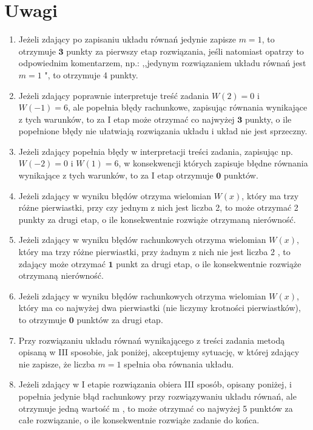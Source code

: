 \documentclass[10pt]{article}
\begin{document}
\section*{Uwagi}
\begin{enumerate}
  \item Jeżeli zdający po zapisaniu układu równań jedynie zapisze $m=1$, to otrzymuje $\mathbf{3}$ punkty za pierwszy etap rozwiązania, jeśli natomiast opatrzy to odpowiednim komentarzem, np.: ,,jedynym rozwiązaniem układu równań jest $m=1$ ", to otrzymuje 4 punkty.
  \item Jeżeli zdający poprawnie interpretuje treść zadania $W(2)=0$ i $W(-1)=6$, ale popełnia błędy rachunkowe, zapisując równania wynikające z tych warunków, to za I etap może otrzymać co najwyżej $\mathbf{3}$ punkty, o ile popełnione błędy nie ułatwiają rozwiązania układu i układ nie jest sprzeczny.
  \item Jeżeli zdający popełnia błędy w interpretacji treści zadania, zapisując np. $W(-2)=0$ i $W(1)=6$, w konsekwencji których zapisuje błędne równania wynikające z tych warunków, to za I etap otrzymuje $\mathbf{0}$ punktów.
  \item Jeżeli zdający w wyniku błędów otrzyma wielomian $W(x)$, który ma trzy różne pierwiastki, przy czy jednym z nich jest liczba 2, to może otrzymać 2 punkty za drugi etap, o ile konsekwentnie rozwiąże otrzymaną nierówność.
  \item Jeżeli zdający w wyniku błędów rachunkowych otrzyma wielomian $W(x)$, który ma trzy różne pierwiastki, przy żadnym z nich nie jest liczba 2 , to zdający może otrzymać $\mathbf{1}$ punkt za drugi etap, o ile konsekwentnie rozwiąże otrzymaną nierówność.
  \item Jeżeli zdający w wyniku błędów rachunkowych otrzyma wielomian $W(x)$, który ma co najwyżej dwa pierwiastki (nie liczymy krotności pierwiastków), to otrzymuje $\mathbf{0}$ punktów za drugi etap.
  \item Przy rozwiązaniu układu równań wynikającego z treści zadania metodą opisaną w III sposobie, jak poniżej, akceptujemy sytuację, w której zdający nie zapisze, że liczba $m=1$ spełnia oba równania układu.
  \item Jeżeli zdający w I etapie rozwiązania obiera III sposób, opisany poniżej, i popełnia jedynie błąd rachunkowy przy rozwiązywaniu układu równań, ale otrzymuje jedną wartość m , to może otrzymać co najwyżej 5 punktów za całe rozwiązanie, o ile konsekwentnie rozwiąże zadanie do końca.
\end{enumerate}
\end{document}
